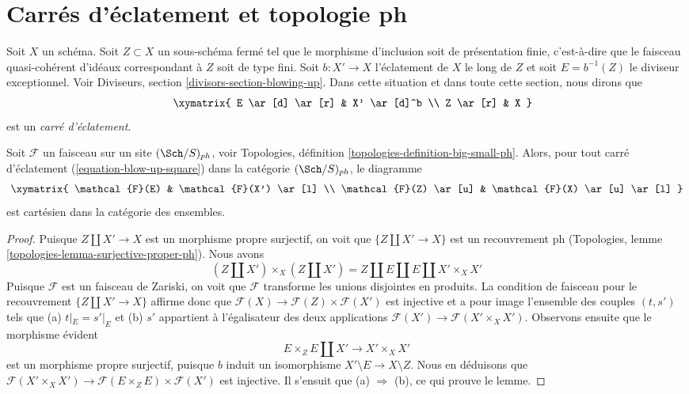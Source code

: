 \section{Carrés d'éclatement et topologie ph}
\label{section-blow-up-ph}

\noindent
Soit $X$ un schéma. Soit $Z \subset X$ un sous-schéma fermé
tel que le morphisme d'inclusion soit de présentation finie, c'est-à-dire que
le faisceau quasi-cohérent d'idéaux correspondant à $Z$ soit de
type fini. Soit $b : X' \to X$ l'éclatement de $X$ le long de $Z$
et soit $E = b^{-1}(Z)$ le diviseur exceptionnel. Voir
Diviseurs, section \ref{divisors-section-blowing-up}.
Dans cette situation et dans toute cette section, nous dirons que
\begin{equation}
\label{equation-blow-up-square}
\vcenter{
\xymatrix{
E \ar[d] \ar[r] & X' \ar[d]^b \\
Z \ar[r] & X
}
}
\end{equation}
est un {\it carré d'éclatement}.

\begin{lemma}
\label{lemma-blow-up-square-ph}
Soit $\mathcal{F}$ un faisceau sur un site $(\Sch/S)_{ph}$, voir
Topologies, définition \ref{topologies-definition-big-small-ph}.
Alors, pour tout carré d'éclatement (\ref{equation-blow-up-square})
dans la catégorie $(\Sch/S)_{ph}$, le diagramme
$$
\xymatrix{
\mathcal{F}(E) & \mathcal{F}(X') \ar[l] \\
\mathcal{F}(Z) \ar[u] & \mathcal{F}(X) \ar[u] \ar[l]
}
$$
est cartésien dans la catégorie des ensembles.
\end{lemma}

\begin{proof}
Puisque $Z \amalg X' \to X$ est un morphisme propre surjectif,
on voit que $\{Z \amalg X' \to X\}$ est un recouvrement ph
(Topologies, lemme \ref{topologies-lemma-surjective-proper-ph}).
Nous avons
$$
(Z \amalg X') \times_X (Z \amalg X') =
Z \amalg E \amalg E \amalg X' \times_X X'
$$
Puisque $\mathcal{F}$ est un faisceau de Zariski, on voit que
$\mathcal{F}$ transforme les unions disjointes en produits.
La condition de faisceau pour le recouvrement
$\{Z \amalg X' \to X\}$ affirme donc que
$\mathcal{F}(X) \to \mathcal{F}(Z) \times \mathcal{F}(X')$
est injective et a pour image l'ensemble des couples $(t, s')$ tels que
(a) $t|_E = s'|_E$ et (b) $s'$ appartient à l'égalisateur des deux applications
$\mathcal{F}(X') \to \mathcal{F}(X' \times_X X')$.
Observons ensuite que le morphisme évident
$$
E \times_Z E \amalg X' \longrightarrow X' \times_X X'
$$
est un morphisme propre surjectif, puisque $b$ induit
un isomorphisme $X' \setminus E \to X \setminus Z$. Nous en déduisons que
$\mathcal{F}(X' \times_X X') \to
\mathcal{F}(E \times_Z E) \times \mathcal{F}(X')$ est injective.
Il s'ensuit que (a) $\Rightarrow$ (b), ce qui prouve le lemme.
\end{proof}

